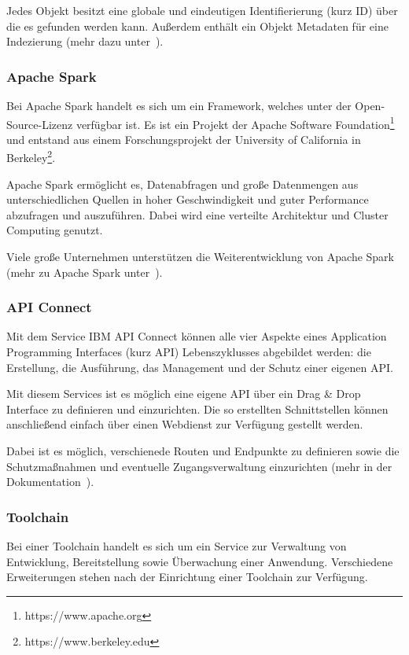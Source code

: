 Jedes Objekt besitzt eine globale und eindeutigen Identifierierung (kurz ID) über die es gefunden werden kann. Außerdem
enthält ein Objekt Metadaten für eine Indezierung (mehr dazu unter~\cite{book_grundlagen_objectstorage}).

\subsubsection{Apache Spark}
Bei Apache Spark handelt es sich um ein Framework, welches unter der Open-Source-Lizenz verfügbar ist. Es ist ein
Projekt der Apache Software Foundation\footnote{https://www.apache.org} und entstand aus einem Forschungsprojekt der
University of California in Berkeley\footnote{https://www.berkeley.edu}.

Apache Spark ermöglicht es, Datenabfragen und große Datenmengen aus unterschiedlichen Quellen in hoher Geschwindigkeit
und guter Performance abzufragen und auszuführen. Dabei wird eine verteilte Architektur und Cluster Computing genutzt.

Viele große Unternehmen unterstützen die Weiterentwicklung von Apache Spark (mehr zu Apache Spark
unter~\cite{book_grundlagen_apachespark}).

\subsubsection{API Connect}
Mit dem Service IBM API Connect können alle vier Aspekte eines Application Programming Interfaces (kurz API)
Lebenszyklusses abgebildet werden: die Erstellung, die Ausführung, das Management und der Schutz einer eigenen API.

Mit diesem Services ist es möglich eine eigene API über ein Drag \& Drop Interface zu definieren und einzurichten. Die
so erstellten Schnittstellen können anschließend einfach über einen Webdienst zur Verfügung gestellt werden.

Dabei ist es möglich, verschienede Routen und Endpunkte zu definieren sowie die Schutzmaßnahmen und eventuelle
Zugangsverwaltung einzurichten (mehr in der Dokumentation~\cite{book_grundlagen_apiconnect}).

\subsubsection{Toolchain}
Bei einer Toolchain handelt es sich um ein Service zur Verwaltung von Entwicklung, Bereitstellung sowie Überwachung
einer Anwendung. Verschiedene Erweiterungen stehen nach der Einrichtung einer Toolchain zur Verfügung.

